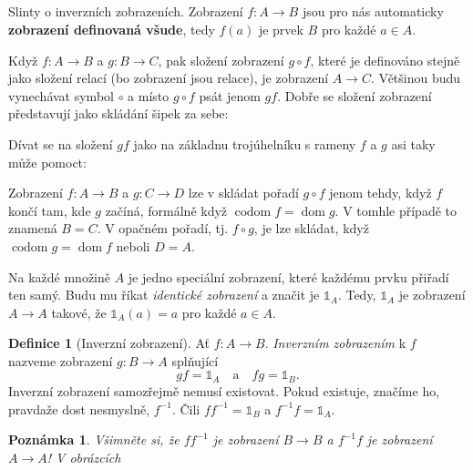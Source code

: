 \documentclass[a4paper,11pt]{article}
\title{\Huge\textsf{}\\
 \Large\textsf{}
 \author{}
 \date{}
}
\theoremstyle{plain}
\newtheorem*{rmrk}{Poznámka}
\theoremstyle{definition}
\newtheorem*{defin}{Definice}
\theoremstyle{theorem}
\DeclareMathOperator{\dom}{dom}
\DeclareMathOperator{\codom}{codom}
\begin{document}
Slinty o inverzních zobrazeních. Zobrazení $f:A \to B$ jsou pro nás automaticky
\textbf{zobrazení definovaná všude}, tedy $f(a)$ je prvek $B$ pro každé $a \in
A$.

Když $f:A \to B$ a $g:B \to C$, pak složení zobrazení $g \circ f$, které je
definováno stejně jako složení relací (bo zobrazení jsou relace), je zobrazení
$A \to C$. Většinou budu vynechávat symbol $ \circ $ a místo $g \circ f$ psát
jenom $gf$. Dobře se složení zobrazení představují jako skládání šipek za sebe:
\begin{center}
\end{center}

Dívat se na složení $gf$ jako na základnu trojúhelníku s rameny $f$ a $g$ asi
taky může pomoct:

\begin{center}
\end{center}

Zobrazení $f:A \to B$ a $g:C \to D$ lze v skládat pořadí $g \circ f$ jenom
tehdy, když $f$ končí tam, kde $g$ začíná, formálně když $\codom f = \dom g$. V
tomhle případě to znamená $B = C$. V opačném pořadí, tj. $f \circ g$, je lze
skládat, když $\codom g = \dom f$ neboli $D = A$.

Na každé množině $A$ je jedno speciální zobrazení, které každému prvku přiřadí
ten samý. Budu mu říkat \emph{identické zobrazení} a značit je $\mathds{1}_A$.
Tedy, $\mathds{1}_A$ je zobrazení $A \to A$ takové, že $\mathds{1}_A(a) = a$ pro
každé $a \in A$.

\begin{defin}[Inverzní zobrazení]
 Ať $f:A \to B$. \emph{Inverzním zobrazením} k $f$ nazveme zobrazení $g:B \to A$
 splňující
 \[
  gf = \mathds{1}_A \quad \text{a} \quad fg = \mathds{1}_B.
 \]
 Inverzní zobrazení samozřejmě nemusí existovat. Pokud existuje, značíme ho,
 pravdaže dost nesmyslně, $f^{-1}$. Čili $ff^{-1} = \mathds{1}_{B}$ a $f^{-1}f =
 \mathds{1}_{A}$.
\end{defin}

\begin{rmrk}
 Všimněte si, že $ff^{-1}$ je zobrazení $B \to B$ a $f^{-1}f$ je zobrazení $A
 \to A$! V obrázcích
 \begin{center}
 \end{center}
\end{rmrk}
\end{document}
